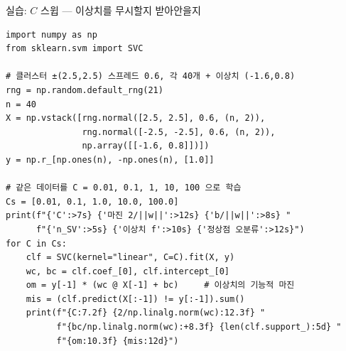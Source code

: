 \begin{frame}[fragile]{실습: $C$ 스윕 — 이상치를 무시할지 받아안을지}
  \begingroup\lstset{basicstyle=\ttfamily\tiny}
  \begin{lstlisting}
import numpy as np
from sklearn.svm import SVC

# 클러스터 ±(2.5,2.5) 스프레드 0.6, 각 40개 + 이상치 (-1.6,0.8)
rng = np.random.default_rng(21)
n = 40
X = np.vstack([rng.normal([2.5, 2.5], 0.6, (n, 2)),
               rng.normal([-2.5, -2.5], 0.6, (n, 2)),
               np.array([[-1.6, 0.8]])])
y = np.r_[np.ones(n), -np.ones(n), [1.0]]

# 같은 데이터를 C = 0.01, 0.1, 1, 10, 100 으로 학습
Cs = [0.01, 0.1, 1.0, 10.0, 100.0]
print(f"{'C':>7s} {'마진 2/||w||':>12s} {'b/||w||':>8s} "
      f"{'n_SV':>5s} {'이상치 f':>10s} {'정상점 오분류':>12s}")
for C in Cs:
    clf = SVC(kernel="linear", C=C).fit(X, y)
    wc, bc = clf.coef_[0], clf.intercept_[0]
    om = y[-1] * (wc @ X[-1] + bc)     # 이상치의 기능적 마진
    mis = (clf.predict(X[:-1]) != y[:-1]).sum()
    print(f"{C:7.2f} {2/np.linalg.norm(wc):12.3f} "
          f"{bc/np.linalg.norm(wc):+8.3f} {len(clf.support_):5d} "
          f"{om:10.3f} {mis:12d}")
\end{lstlisting}
  \endgroup
\end{frame}
